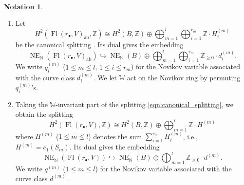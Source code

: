 \documentclass[a4paper,12pt]{amsart}
\numberwithin{equation}{section}
\theoremstyle{definition}
\newtheorem{notation}[theorem]{Notation}
\newcommand{\C}{\mathbb{C}}
\newcommand{\Z}{\mathbb{Z}}
\newcommand{\N}{\mathbb{N}}
\newcommand{\G}{\mathbb{G}}
\newcommand{\T}{\mathbb{T}}
\newcommand{\W}{\mathbb{W}}
\newcommand{\NE}{\operatorname{NE}_{\N}}
\newcommand{\Fl}{\operatorname{Fl}}
\begin{document}
\begin{notation}
\begin{enumerate}
        For future reference, we describe explicitly the Lie algebra bundle  $\mathfrak{g}/\mathfrak{t}$ on $\Fl(r_\bullet,V)_{\operatorname{ab}}$ (with its decomposition $\mathfrak{g}/\mathfrak{t}=\oplus_{\alpha:\; {\mathrm{root\; of }}\;\G}L_\alpha$), which appears in the abelian/nonabelian correspondence, as explained in the Introduction. The Lie
        algebra $\mathfrak{g}=\oplus_{m=1}^l Lie(\mathrm{GL}_{r_m}(\C))$, viewed as the adjoint $\T$-representation, gives rise to the vector bundle
        $$\bigoplus_{m=1}^l\left((S_m^\vee)_\T\otimes(S_m)_\T\right)=\bigoplus_{m=1}^l\bigoplus_{1\leq i,j\leq r_m}\left(\mathcal{O}(H_i^{(m)})\otimes \mathcal{O}(-H_j^{(m)})\right),$$
        whose trivial subbundle of rank $r_1+\dots +r_l$ (coming from the triples $(m,i,j)$ with $i=j$) corresponds to the Cartan subalgebra $\mathfrak{t}$. Hence
        \begin{equation}\label{eqn:gmodt_explicit}
            \mathfrak{g}/\mathfrak{t}=\bigoplus_{m=1}^l\bigoplus_{1\leq i\neq j\leq r_m}\mathcal{O}\left( H_i^{(m)}-H_j^{(m)}\right).
        \end{equation}
        \item 
        Let 
        \begin{equation}\label{eqn:canonical_splitting}
        H^2(\Fl(r_\bullet,V)_{\operatorname{ab}},\Z)\cong H^2(B,\Z)\oplus\bigoplus_{m=1}^l\bigoplus_{i=1}^{r_m}\Z\cdot H^{(m)}_i
        \end{equation}
        be the canonical splitting \cite[Section 3.3]{Koto:mirror}.
        Its dual gives the embedding
        \[
        \NE(\Fl(r_\bullet,V)_{\operatorname{ab}}) \hookrightarrow \NE(B)\oplus\bigoplus_{m=1}^l\bigoplus_{i=1}^{r_m}\Z_{\geq0}\cdot d^{(m)}_i.
        \]
        We write $q^{(m)}_i$ ($1\leq m\leq l$, $1\leq i\leq r_m$) for the Novikov variable associated with the curve class $d^{(m)}_i$.
        We let $\W$ act on the Novikov ring by permuting $q^{(m)}_i$'s.
        \item 
        Taking the $\W$-invariant part of the splitting \eqref{eqn:canonical_splitting}, we obtain the splitting
        \[
        H^2(\Fl(r_\bullet,V),\Z)\cong H^2(B,\Z)\oplus\bigoplus_{m=1}^l \Z\cdot H^{(m)}
        \]
        where $H^{(m)}$ ($1\leq m\leq l$) denotes the sum $\sum_{i=1}^{r_m}H^{(m)}_i$, i.e., $H^{(m)}=c_1(S_m)$.
        Its dual gives the embedding
        \[
        \NE(\Fl(r_\bullet,V)) \hookrightarrow \NE(B)\oplus\bigoplus_{m=1}^l\Z_{\geq0}\cdot d^{(m)}.
        \]
        We write $q^{(m)}$ ($1\leq m\leq l$) for the Novikov variable associated with the curve class $d^{(m)}$.
    \end{enumerate}
\end{notation}
\end{document}
